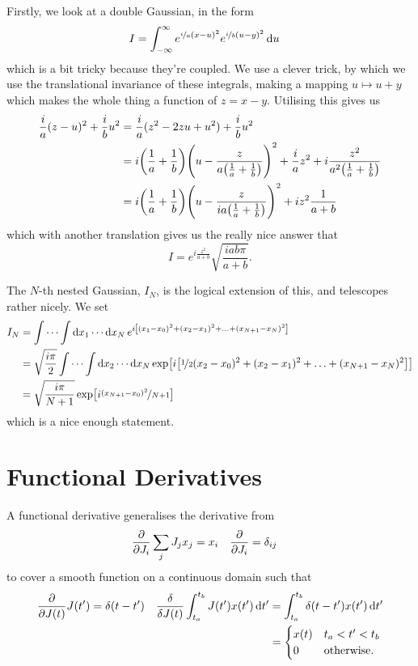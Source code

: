 Firstly, we look at a double Gaussian, in the form
\begin{align*}
  I &= \int_{-\infty}^\infty e^{\nicefrac{i}{a} {(x-u)^2}}e^{ \nicefrac{i}{b}(u-y)^2}\dd{u}
\end{align*}
which is a bit tricky because they're coupled.
We use a clever trick, by which we use the translational invariance of these integrals, making a mapping \( u \mapsto u + y \) which makes the whole thing a function of \( z = x - y \).
Utilising this gives us
\begin{align*}
  \frac{i}{a}(z-u)^2 + \frac{i}{b}u^2 &= \frac{i}{a}(z^2 - 2zu + u^2) + \frac{i}{b}u^2\\
  &= i\qty(\frac{1}{a} + \frac{1}{b})\qty(u - \frac{z}{a \qty(\frac{1}{a} + \frac{1}{b})})^2 + \frac{i}{a}z^2 + i \frac{z^2}{a^2 \qty(\frac{1}{a}  + \frac{1}{b})}\\
  &= i\qty(\frac{1}{a} + \frac{1}{b})\qty(u - \frac{z}{ia \qty(\frac{1}{a} + \frac{1}{b})})^2 + iz^2\frac{1}{a + b}
\end{align*}
which with another translation gives us the really nice answer that \[ I = e^{i\frac{z^2}{a + b}} \sqrt{\frac{iab\pi}{a+b}}.\]

The $N$-th nested Gaussian, \( I_N \), is the logical extension of this, and telescopes rather nicely.
We set
\begin{align*}
  I_N &= \idotsint \dd{x_1} \cdots \dd{x_N} e^{i \qty[ (x_1 - x_0 )^2 + (x_2 - x_1)^2 + \ldots + (x_{N+1} - x_{N})^2]}\\
      &= \sqrt{\frac{i\pi}{2}}\idotsint \dd{x_2} \cdots \dd{x_N} \exp[i \qty[ \nicefrac{1}{2}(x_2 - x_0 )^2 + (x_2 - x_1)^2 + \ldots + (x_{N+1} - x_{N})^2]]\\
      &= \sqrt{\frac{i\pi}{N+1}}\exp[i \nicefrac{(x_{N+1} - x_0)^2}{N+1}]
\end{align*}
which is a nice enough statement.

\chapter{Functional Derivatives}
A functional derivative generalises the derivative from
\begin{align*}
  \pdv{J_i}\sum_j J_j x_j &= x_i & \pdv{J_i} &= \delta_{ij}
\end{align*}
to cover a smooth function on a continuous domain such that
\begin{align*}
  \pdv{J(t)}J(t^\prime) &= \delta(t-t^\prime) & \fdv{J(t)}  \int_{t_a}^{t_b} J(t^\prime) x(t^\prime) \dd{t^\prime} &= \int_{t_a}^{t_b} \delta(t - t^\prime) x(t^\prime) \dd{t^\prime}\\
  &&&= \begin{cases}
    x(t) & t_a < t^\prime < t_b\\
    0 & \text{otherwise}.
  \end{cases}
\end{align*}

